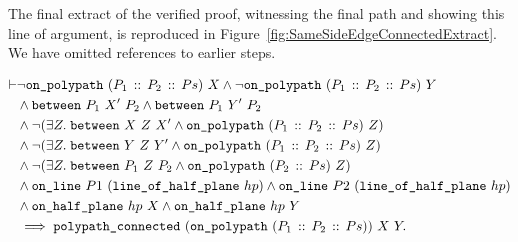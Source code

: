 The final extract of the verified proof, witnessing the final path and showing this line of argument, is reproduced in Figure~\ref{fig:SameSideEdgeConnectedExtract}. We have omitted references to earlier steps.

\begin{equation}
  \label{eq:SameSideEdgeConnected}
  \begin{split}
\vdash &\neg\texttt{on\_polypath}\ (P_1\,::\,P_2\,::\,Ps)\ X \wedge\neg\texttt{on\_polypath}\ (P_1\,::\,P_2\,::\,Ps)\ Y\\
    &\wedge\texttt{between}\ P_1\ X'\ P_2\wedge\texttt{between}\ P_1\ Y'\ P_2\\
    &\wedge\neg(\exists Z.\; \texttt{between}\ X\ Z\ X' \wedge \texttt{on\_polypath}\ (P_1\,::\,P_2\,::\,Ps)\ Z)\\
    &\wedge\neg(\exists Z.\; \texttt{between}\ Y\ Z\ Y' \wedge \texttt{on\_polypath}\ (P_1\,::\,P_2\,::\,Ps)\ Z)\\
    &\wedge\neg(\exists Z.\; \texttt{between}\ P_1\ Z\ P_2 \wedge \texttt{on\_polypath}\ (P_2\,::\,Ps)\ Z)\\
    &\wedge \texttt{on\_line}\ P1\ (\texttt{line\_of\_half\_plane}\ hp) \wedge \texttt{on\_line}\ P2\ (\texttt{line\_of\_half\_plane}\ hp)\\
    &\wedge \texttt{on\_half\_plane}\ hp\ X \wedge \texttt{on\_half\_plane}\ hp\ Y\\
    &\implies \texttt{polypath\_connected}\ (\texttt{on\_polypath}\ (P_1\,::\,P_2\,::\,Ps))\ X\ Y.
  \end{split}
\end{equation}

